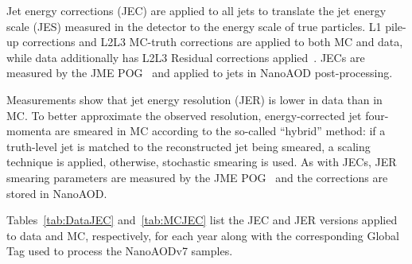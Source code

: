 Jet energy corrections (JEC) are applied to all jets to translate the jet energy scale (JES) measured in the detector to the energy scale of true particles. L1 pile-up corrections and L2L3 MC-truth corrections are applied to both MC and data, while data additionally has L2L3 Residual corrections applied~\cite{JetCorr}. JECs are measured by the JME POG~\cite{JECTwiki} and applied to jets in NanoAOD post-processing. 

Measurements show that jet energy resolution (JER) is lower in data than in MC. To better approximate the observed resolution, energy-corrected jet four-momenta are smeared in MC according to the so-called ``hybrid'' method: if a truth-level jet is matched to the reconstructed jet being smeared, a scaling technique is applied, otherwise, stochastic smearing is used. As with JECs, JER smearing parameters are measured by the JME POG~\cite{JERTwiki} and the corrections are stored in NanoAOD.

Tables~\ref{tab:DataJEC} and~\ref{tab:MCJEC} list the JEC and JER versions applied to data and MC, respectively, for each year along with the corresponding Global Tag used to process the NanoAODv7 samples.

